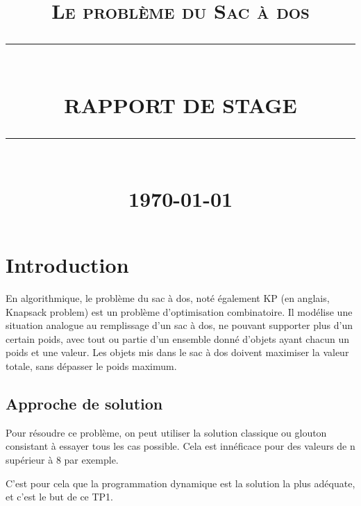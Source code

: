 \documentclass[12pt]{report}
\newcommand{\HRule}[1]{\rule{\linewidth}{#1}}
\begin{document}
	\renewcommand{\contentsname}{Table des Matières}
	\author{}        
	\date{} 
	\title{  \textsc{ Le problème du Sac à dos}
		\\ [2.0cm]
		\HRule{0.5pt} \\
		\LARGE \textbf{\uppercase{Rapport de Stage }}
		\HRule{2pt} \\ [0.5cm]
		\normalsize \today \vspace*{5\baselineskip}}
	\maketitle
	\tableofcontents
	\renewcommand{\contentsname}
	\newpage
	\sectionfont{\scshape}
	
	\newpage
	\chapter{Introduction}
	 En algorithmique, le problème du sac à dos, noté également KP (en anglais, Knapsack problem) est un problème d'optimisation combinatoire. Il modélise une situation analogue au remplissage d'un sac à dos, ne pouvant supporter plus d'un certain poids, avec tout ou partie d'un ensemble donné d'objets ayant chacun un poids et une valeur. Les objets mis dans le sac à dos doivent maximiser la valeur totale, sans dépasser le poids maximum.
	\section{Approche de solution}
\par{}
	Pour résoudre ce problème, on peut utiliser la solution classique ou glouton consistant à essayer tous les cas possible. Cela est innéficace pour des valeurs de n supérieur à 8 par exemple.
\par{}
	C'est pour cela que la programmation dynamique est la solution la plus adéquate, et c'est le but de ce TP1.
	
\end{document}

